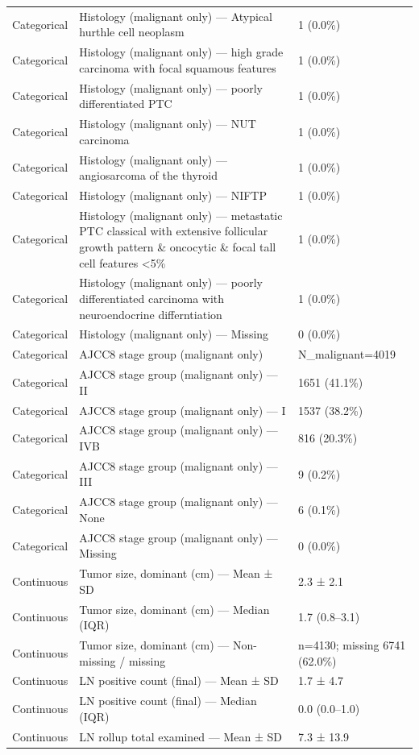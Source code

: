 \begin{table}[htbp]
\begin{tabular}{lll}
Categorical & Histology (malignant only) — Atypical hurthle cell neoplasm & 1 (0.0\%) \\
Categorical & Histology (malignant only) — high grade carcinoma with focal squamous features & 1 (0.0\%) \\
Categorical & Histology (malignant only) — poorly differentiated PTC & 1 (0.0\%) \\
Categorical & Histology (malignant only) — NUT carcinoma & 1 (0.0\%) \\
Categorical & Histology (malignant only) — angiosarcoma of the thyroid & 1 (0.0\%) \\
Categorical & Histology (malignant only) — NIFTP & 1 (0.0\%) \\
Categorical & Histology (malignant only) — metastatic PTC classical with extensive follicular growth pattern \& oncocytic \& focal tall cell features <5\% & 1 (0.0\%) \\
Categorical & Histology (malignant only) — poorly differentiated carcinoma with neuroendocrine differntiation & 1 (0.0\%) \\
Categorical & Histology (malignant only) — Missing & 0 (0.0\%) \\
Categorical & AJCC8 stage group (malignant only) & N\_malignant=4019 \\
Categorical & AJCC8 stage group (malignant only) — II & 1651 (41.1\%) \\
Categorical & AJCC8 stage group (malignant only) — I & 1537 (38.2\%) \\
Categorical & AJCC8 stage group (malignant only) — IVB & 816 (20.3\%) \\
Categorical & AJCC8 stage group (malignant only) — III & 9 (0.2\%) \\
Categorical & AJCC8 stage group (malignant only) — None & 6 (0.1\%) \\
Categorical & AJCC8 stage group (malignant only) — Missing & 0 (0.0\%) \\
Continuous & Tumor size, dominant (cm) — Mean ± SD & 2.3 ± 2.1 \\
Continuous & Tumor size, dominant (cm) — Median (IQR) & 1.7 (0.8–3.1) \\
Continuous & Tumor size, dominant (cm) — Non-missing / missing & n=4130; missing 6741 (62.0\%) \\
Continuous & LN positive count (final) — Mean ± SD & 1.7 ± 4.7 \\
Continuous & LN positive count (final) — Median (IQR) & 0.0 (0.0–1.0) \\
Continuous & LN rollup total examined — Mean ± SD & 7.3 ± 13.9 \\

\end{tabular}
\end{table}

